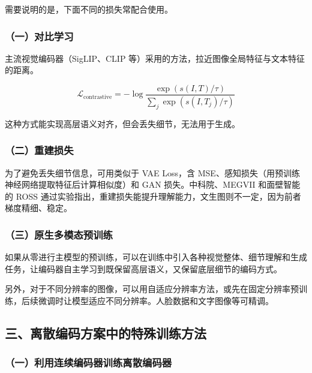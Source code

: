需要说明的是，下面不同的损失常配合使用。

\hypertarget{ux4e00ux5bf9ux6bd4ux5b66ux4e60-1}{%
\subsubsection{（一）对比学习}\label{ux4e00ux5bf9ux6bd4ux5b66ux4e60-1}}

主流视觉编码器（SigLIP、CLIP 等）采用的方法，拉近图像全局特征与文本特征的距离。

\[
\mathcal{L}_{\mathrm{contrastive}}
=-\log\frac{\exp(s(I,T)/\tau)}
{\sum_j\exp(s(I,T_j)/\tau)}
\]

这种方式能实现高层语义对齐，但会丢失细节，无法用于生成。

\hypertarget{ux4e8cux91cdux5efaux635fux5931}{%
\subsubsection{（二）重建损失}\label{ux4e8cux91cdux5efaux635fux5931}}

为了避免丢失细节信息，可用类似于 VAE Loss，含 MSE、感知损失（用预训练神经网络提取特征后计算相似度）和 GAN 损失。中科院、MEGVII 和面壁智能的 ROSS 通过实验指出，重建损失能提升理解能力，文生图则不一定，因为前者梯度精细、稳定。

\hypertarget{ux4e09ux539fux751fux591aux6a21ux6001ux9884ux8badux7ec3}{%
\subsubsection{（三）原生多模态预训练}\label{ux4e09ux539fux751fux591aux6a21ux6001ux9884ux8badux7ec3}}

如果从零进行主模型的预训练，可以在训练中引入各种视觉整体、细节理解和生成任务，让编码器自主学习到既保留高层语义，又保留底层细节的编码方式。

另外，对于不同分辨率的图像，可以用自适应分辨率方法，或先在固定分辨率预训练，后续微调时让模型适应不同分辨率。人脸数据和文字图像等可精调。

\hypertarget{ux4e09ux79bbux6563ux7f16ux7801ux65b9ux6848ux4e2dux7684ux7279ux6b8aux8badux7ec3ux65b9ux6cd5}{%
\subsection{三、离散编码方案中的特殊训练方法}\label{ux4e09ux79bbux6563ux7f16ux7801ux65b9ux6848ux4e2dux7684ux7279ux6b8aux8badux7ec3ux65b9ux6cd5}}

\hypertarget{ux4e00ux5229ux7528ux8fdeux7eedux7f16ux7801ux5668ux8badux7ec3ux79bbux6563ux7f16ux7801ux5668}{%
\subsubsection{（一）利用连续编码器训练离散编码器}\label{ux4e00ux5229ux7528ux8fdeux7eedux7f16ux7801ux5668ux8badux7ec3ux79bbux6563ux7f16ux7801ux5668}}

